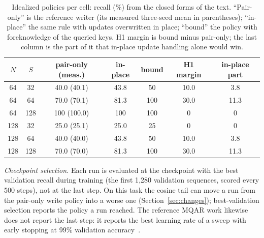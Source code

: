 \documentclass[conference]{IEEEtran}
\begin{document}
\begin{table}[t]
\caption{Idealized policies per cell: recall (\%) from the closed forms of the
text. ``Pair-only'' is the reference writer (its measured three-seed mean in
parentheses); ``in-place'' the same rule with updates overwritten in place;
``bound'' the policy with foreknowledge of the queried keys. H1 margin is
bound minus pair-only; the last column is the part of it that in-place update
handling alone would win.}
\label{tab:ceiling}
\centering
\footnotesize
\setlength{\tabcolsep}{3pt}
\begin{tabular}{@{}ccccccc@{}}
\toprule
$N$ & $S$ & pair-only (meas.) & in-place & bound & H1 margin & in-place part \\
\midrule
64 & 32 & 40.0 (40.1) & 43.8 & 50 & 10.0 & 3.8 \\
64 & 64 & 70.0 (70.1) & 81.3 & 100 & 30.0 & 11.3 \\
64 & 128 & 100 (100.0) & 100 & 100 & 0 & 0 \\
128 & 32 & 25.0 (25.1) & 25.0 & 25 & 0 & 0 \\
128 & 64 & 40.0 (40.0) & 43.8 & 50 & 10.0 & 3.8 \\
128 & 128 & 70.0 (70.0) & 81.3 & 100 & 30.0 & 11.3 \\
\bottomrule
\end{tabular}
\end{table}

\textit{Checkpoint selection.} Each run is evaluated at the checkpoint with the
best validation recall during training (the first 1{,}280 validation sequences,
scored every 500 steps), not at the last step. On this task the cosine tail can
move a run from the pair-only write policy into a worse one
(Section~\ref{sec:changes}); best-validation selection reports the policy a
run reached. The reference MQAR work likewise does not report the last step:
it reports the best learning rate of a sweep with early stopping at 99\%
validation accuracy~\cite{arora2023zoology}.
\end{document}
